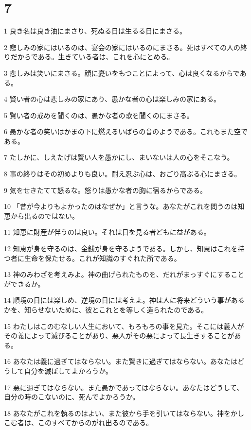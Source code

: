 \chapter{7}

\par 1 良き名は良き油にまさり、死ぬる日は生るる日にまさる。
\par 2 悲しみの家にはいるのは、宴会の家にはいるのにまさる。死はすべての人の終りだからである。生きている者は、これを心にとめる。
\par 3 悲しみは笑いにまさる。顔に憂いをもつことによって、心は良くなるからである。
\par 4 賢い者の心は悲しみの家にあり、愚かな者の心は楽しみの家にある。
\par 5 賢い者の戒めを聞くのは、愚かな者の歌を聞くのにまさる。
\par 6 愚かな者の笑いはかまの下に燃えるいばらの音のようである。これもまた空である。
\par 7 たしかに、しえたげは賢い人を愚かにし、まいないは人の心をそこなう。
\par 8 事の終りはその初めよりも良い。耐え忍ぶ心は、おごり高ぶる心にまさる。
\par 9 気をせきたてて怒るな。怒りは愚かな者の胸に宿るからである。
\par 10 「昔が今よりもよかったのはなぜか」と言うな。あなたがこれを問うのは知恵から出るのではない。
\par 11 知恵に財産が伴うのは良い。それは日を見る者どもに益がある。
\par 12 知恵が身を守るのは、金銭が身を守るようである。しかし、知恵はこれを持つ者に生命を保たせる。これが知識のすぐれた所である。
\par 13 神のみわざを考えみよ。神の曲げられたものを、だれがまっすぐにすることができるか。
\par 14 順境の日には楽しめ、逆境の日には考えよ。神は人に将来どういう事があるかを、知らせないために、彼とこれとを等しく造られたのである。
\par 15 わたしはこのむなしい人生において、もろもろの事を見た。そこには義人がその義によって滅びることがあり、悪人がその悪によって長生きすることがある。
\par 16 あなたは義に過ぎてはならない。また賢きに過ぎてはならない。あなたはどうして自分を滅ぼしてよかろうか。
\par 17 悪に過ぎてはならない。また愚かであってはならない。あなたはどうして、自分の時のこないのに、死んでよかろうか。
\par 18 あなたがこれを執るのはよい、また彼から手を引いてはならない。神をかしこむ者は、このすべてからのがれ出るのである。
